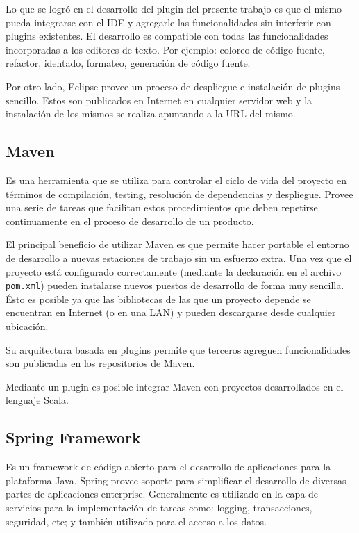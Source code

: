 \documentclass[12pt,a4paper]{article}
\begin{document}
Lo que se logró en el desarrollo del plugin del presente trabajo es que el mismo pueda integrarse con el IDE
y agregarle las funcionalidades sin interferir con plugins existentes. El desarrollo es compatible
con todas las funcionalidades incorporadas a los editores de texto. Por ejemplo: coloreo de código fuente, refactor,
identado, formateo, generación de código fuente.

Por otro lado, Eclipse provee un proceso de despliegue e instalación de plugins sencillo. Estos son publicados 
en Internet en cualquier servidor web y la instalación de los mismos se realiza apuntando a la URL del mismo.

\subsection{Maven}
Es una herramienta que se utiliza para controlar el ciclo de vida del proyecto en términos de compilación, testing,
resolución de dependencias y despliegue. Provee una serie de tareas que facilitan estos procedimientos que deben
repetirse continuamente en el proceso de desarrollo de un producto.

El principal beneficio de utilizar Maven es que permite hacer portable el entorno de desarrollo a nuevas estaciones
de trabajo sin un esfuerzo extra. Una vez que el proyecto está configurado correctamente (mediante la declaración en el 
archivo \texttt{pom.xml}) pueden instalarse nuevos puestos de desarrollo de forma muy sencilla. Ésto es posible
ya que las bibliotecas de las que un proyecto depende se encuentran en Internet (o en una LAN) y pueden descargarse
desde cualquier ubicación.

Su arquitectura basada en plugins permite que terceros agreguen funcionalidades son publicadas en los repositorios
de Maven.

Mediante un plugin es posible integrar Maven con proyectos desarrollados en el lenguaje Scala.

\subsection{Spring Framework}
Es un framework de código abierto para el desarrollo de aplicaciones para la plataforma Java. Spring provee soporte
para simplificar el desarrollo de diversas partes de aplicaciones enterprise. Generalmente es utilizado en
la capa de servicios para la implementación de tareas como: logging, transacciones, seguridad, etc; y también 
utilizado para el acceso a los datos.
\end{document}
